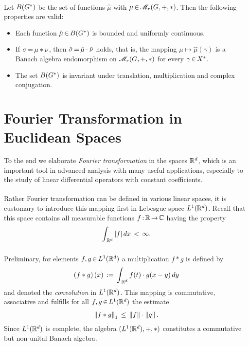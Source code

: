 \documentclass[11pt,twoside]{article}
\begin{document}
\paragraph{} %
Let $B(G^*)$ be the set of functions $\hat{\mu}$
with $\mu {\,\in\,} \mathscr{M}_{r}(G,+,*)$.
Then the following properties are valid:

\begin{itemize}[leftmargin=12pt]
\item[1.]
Each function $\hat{\mu} {\,\in\,} B(G^*)$ is bounded and uniformly continuous.

\item[2.]
If $\sigma {\,=\,} \mu * \nu$,
then $\hat{\sigma} {\,=\,} \hat{\mu} \cdot \hat{\nu}$ holds,
that is,
the mapping $\mu \mapsto \hat{\mu}(\gamma)$ 
is a Banach algebra endomorphism on $\mathscr{M}_{r}(G,+,*)$
for every $\gamma {\,\in\,} X^*$.

\item[3.]
The set $B(G^*)$ is invariant under translation, multiplication and
complex conjugation.
\end{itemize}

\section{Fourier Transformation in Euclidean Spaces}
To the end we elaborate \textit{Fourier transformation} in the spaces ${\mathbb{R}}^d$,
which is an important tool in advanced analysis with many useful applications,
especially to the study of
linear differential operators with constant coefficients.

\paragraph{} %
Rather Fourier transformation can be defined in various linear spaces,
it is customary to introduce this mapping first in Lebesgue space $L^1({\mathbb{R}}^d)$.
Recall that this space contains all measurable functions $f {\,:\,} {\mathbb{R}} {\,\to\,} {\mathbb{C}}$
having the property
\[
\int_{\,\Rd} \, \abs{f} \, dx \, < \, \infty.
\]

\subparagraph{} %
Preliminary,
for elements $f,g {\,\in\,} L^1({\mathbb{R}}^d)$ 
a multiplication $f \ast g$ is defined by
\[
(f \ast g) \, (x) \,:=\, \int_{\,{\mathbb{R}}^d} f(t) \cdot g(x-y) \, dy
\]
and denoted the \textit{convolution} in $L^1({\mathbb{R}}^d)$.
This mapping is commutative, associative and fulfills
for all $f,g {\,\in\,} L^1({\mathbb{R}}^d)$ the estimate
\[
\left\lVert f \ast g \right\rVert_1 \, \leq \, \left\lVert f \right\rVert \cdot \left\lVert g \right\rVert.
\]
Since $L^1({\mathbb{R}}^d)$ is complete,
the algebra $(L^1({\mathbb{R}}^d),+,\ast)$
constitutes a commutative but non-unital Banach algebra.
\end{document}
